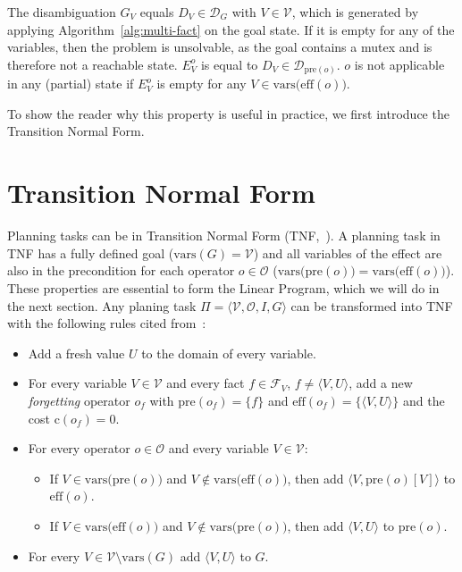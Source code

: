 The disambiguation $G_V$ equals $D_V\in\mathcal{D}_G$ with $V\in\mathcal{V}$, which is generated by applying Algorithm~\ref{alg:multi-fact} on the goal state.
If it is empty for any of the variables, then the problem is unsolvable, as the goal contains a mutex and is therefore not a reachable state.
$E_V^o$ is equal to $D_V\in\mathcal{D}_{\text{pre}(o)}$.
$o$ is not applicable in any (partial) state if $E^o_V$ is empty for any  $V\in\text{vars(eff}(o))$.

To show the reader why this property is useful in practice, we first introduce the Transition Normal Form.

\section{Transition Normal Form}\label{sec:transition-normal-form}
Planning tasks can be in Transition Normal Form (TNF,~\citeauthor{pommerening2015normal}).
A planning task in TNF has a fully defined goal ($\text{vars}(G)=\mathcal{V}$) and all variables of the effect are also in the precondition for each operator $o\in\mathcal{O}$ ($\text{vars(pre}(o)) = \text{vars(eff}(o))$).
These properties are essential to form the Linear Program, which we will do in the next section.
Any planing task  $\Pi = \langle \mathcal{V}, \mathcal{O}, I, G \rangle$ can be transformed into TNF with the following rules cited from~\citeauthor{fivser2020strengthening}:
\begin{itemize}
    \item Add a fresh value $U$ to the domain of every variable.
    \item For every variable $V\in\mathcal{V}$ and every fact $f\in\mathcal{F}_V$, $f\neq\langle V,U\rangle$, add a new \textit{forgetting} operator $o_f$ with $\text{pre}(o_f)=\{f\}$ and $\text{eff}(o_f)=\{\langle V,U\rangle\}$ and the cost $\text{c}(o_f)=0$.
    \item For every operator $o\in\mathcal{O}$ and every variable $V\in\mathcal{V}$:
    \begin{itemize}
        \item If $V\in\text{vars(pre}(o))$ and $V\notin\text{vars(eff}(o))$, then add $\langle V,\text{pre}(o)[V]\rangle$ to $\text{eff}(o)$.
        \item If $V\in\text{vars(eff}(o))$ and $V\notin\text{vars(pre}(o))$, then add $\langle V,U\rangle$ to $\text{pre}(o)$.
    \end{itemize}
    \item For every $V\in\mathcal{V}\setminus\text{vars}(G)$ add $\langle V,U\rangle$ to $G$.
\end{itemize}

